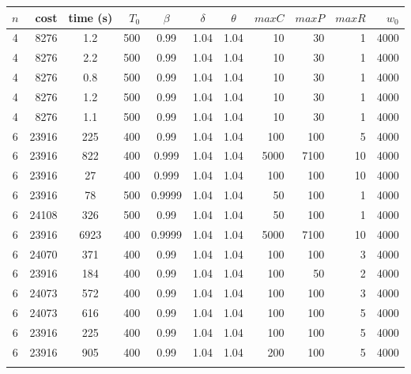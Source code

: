 \begin{table}[hbpt] \centering\footnotesize
\begin{tabular}
{ c   r      S  r    *{3}{S}    r  r          r           r  } \toprule
{$n$} & {cost} & {time (s)} & {$T_0$} & {$\beta$} & {$\delta$} & {$\theta$} & {$maxC$} & {$maxP$} & {$maxR$} & {$w_0$} \\  \midrule

4 & 8276    &	1.2 & 500&	0.99&	1.04&	1.04&	10&	30&	1&	4000 \\
4 & 8276    &	2.2 & 500&	0.99&	1.04&	1.04&	10&	30&	1&	4000\\
4 & 8276     &   0.8 & 500&	0.99&	1.04&	1.04&	10&	30&	1&	4000\\
4 &8276    &	1.2	& 500&	0.99&   1.04&	1.04&	10&	30& 1&	4000\\
4 & 8276    &	1.1	& 500&	0.99&	1.04&	1.04&	10&	30&	1&	4000\\ \addlinespace

6 & 23916 &	225 &	400&	0.99  & 1.04&	1.04&  100 & 100 &	5 &	4000\\
6 & 23916 &	822 &	400&    0.999 &	1.04&	1.04&  5000& 7100&	10&	4000\\
6 & 23916 &	27  &	400&	0.999 &	1.04&	1.04&  100 & 100 &	10&	4000\\
6 & 23916 &	78  &	500&	0.9999&	1.04&   1.04&  50  & 100 &	1 &	4000\\
6 & 24108 & 326 &	500&	0.99  & 1.04&	1.04&  50  & 100 &	1 &	4000     \\
6 & 23916 & 6923&	400&	0.9999& 1.04&	1.04&  5000& 7100&	10&	4000\\
6 & 24070&	371	&400&	0.99&	1.04&	1.04&	100	&100&	3&  4000  \\
6 & 23916&  184	&400&	0.99&	1.04&	1.04&	100 &50 &	2&	4000\\
6 & 24073&	572	&400&	0.99&	1.04&   1.04&	100 &100&	3&	4000\\
6 & 24073&	616	&400&	0.99&	1.04&   1.04&	100	&100&	5&	4000\\
6 & 23916&	225	&400&	0.99&	1.04&   1.04&	100	&100&	5&	4000\\
6 & 23916&	905	&400&	0.99&	1.04&   1.04&	200	&100&	5&	4000\\ \addlinespace


\end{tabular}
\end{table}
